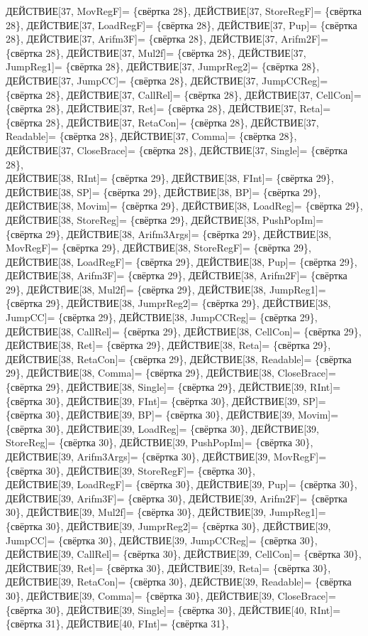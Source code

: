 \documentclass[a0]{a0poster}
\begin{document}
ДЕЙСТВИЕ[37, MovRegF]= \{свёртка 28\}, ДЕЙСТВИЕ[37, StoreRegF]= \{свёртка 28\}, ДЕЙСТВИЕ[37, LoadRegF]= \{свёртка 28\}, ДЕЙСТВИЕ[37, Pup]= \{свёртка 28\}, ДЕЙСТВИЕ[37, Arifm3F]= \{свёртка 28\}, ДЕЙСТВИЕ[37, Arifm2F]= \{свёртка 28\}, ДЕЙСТВИЕ[37, Mul2f]= \{свёртка 28\}, ДЕЙСТВИЕ[37, JumpReg1]= \{свёртка 28\}, ДЕЙСТВИЕ[37, JumprReg2]= \{свёртка 28\}, ДЕЙСТВИЕ[37, JumpCC]= \{свёртка 28\}, ДЕЙСТВИЕ[37, JumpCCReg]= \{свёртка 28\}, ДЕЙСТВИЕ[37, CallRel]= \{свёртка 28\}, ДЕЙСТВИЕ[37, CellCon]= \{свёртка 28\}, ДЕЙСТВИЕ[37, Ret]= \{свёртка 28\}, ДЕЙСТВИЕ[37, Reta]= \{свёртка 28\}, ДЕЙСТВИЕ[37, RetaCon]= \{свёртка 28\}, ДЕЙСТВИЕ[37, Readable]= \{свёртка 28\}, ДЕЙСТВИЕ[37, Comma]= \{свёртка 28\}, ДЕЙСТВИЕ[37, CloseBrace]= \{свёртка 28\}, ДЕЙСТВИЕ[37, Single]= \{свёртка 28\}, \\
ДЕЙСТВИЕ[38, RInt]= \{свёртка 29\}, ДЕЙСТВИЕ[38, FInt]= \{свёртка 29\}, ДЕЙСТВИЕ[38, SP]= \{свёртка 29\}, ДЕЙСТВИЕ[38, BP]= \{свёртка 29\}, ДЕЙСТВИЕ[38, Movim]= \{свёртка 29\}, ДЕЙСТВИЕ[38, LoadReg]= \{свёртка 29\}, ДЕЙСТВИЕ[38, StoreReg]= \{свёртка 29\}, ДЕЙСТВИЕ[38, PushPopIm]= \{свёртка 29\}, ДЕЙСТВИЕ[38, Arifm3Args]= \{свёртка 29\}, ДЕЙСТВИЕ[38, MovRegF]= \{свёртка 29\}, ДЕЙСТВИЕ[38, StoreRegF]= \{свёртка 29\}, ДЕЙСТВИЕ[38, LoadRegF]= \{свёртка 29\}, ДЕЙСТВИЕ[38, Pup]= \{свёртка 29\}, ДЕЙСТВИЕ[38, Arifm3F]= \{свёртка 29\}, ДЕЙСТВИЕ[38, Arifm2F]= \{свёртка 29\}, ДЕЙСТВИЕ[38, Mul2f]= \{свёртка 29\}, ДЕЙСТВИЕ[38, JumpReg1]= \{свёртка 29\}, ДЕЙСТВИЕ[38, JumprReg2]= \{свёртка 29\}, ДЕЙСТВИЕ[38, JumpCC]= \{свёртка 29\}, ДЕЙСТВИЕ[38, JumpCCReg]= \{свёртка 29\}, \\
ДЕЙСТВИЕ[38, CallRel]= \{свёртка 29\}, ДЕЙСТВИЕ[38, CellCon]= \{свёртка 29\}, ДЕЙСТВИЕ[38, Ret]= \{свёртка 29\}, ДЕЙСТВИЕ[38, Reta]= \{свёртка 29\}, ДЕЙСТВИЕ[38, RetaCon]= \{свёртка 29\}, ДЕЙСТВИЕ[38, Readable]= \{свёртка 29\}, ДЕЙСТВИЕ[38, Comma]= \{свёртка 29\}, ДЕЙСТВИЕ[38, CloseBrace]= \{свёртка 29\}, ДЕЙСТВИЕ[38, Single]= \{свёртка 29\}, ДЕЙСТВИЕ[39, RInt]= \{свёртка 30\}, ДЕЙСТВИЕ[39, FInt]= \{свёртка 30\}, ДЕЙСТВИЕ[39, SP]= \{свёртка 30\}, ДЕЙСТВИЕ[39, BP]= \{свёртка 30\}, ДЕЙСТВИЕ[39, Movim]= \{свёртка 30\}, ДЕЙСТВИЕ[39, LoadReg]= \{свёртка 30\}, ДЕЙСТВИЕ[39, StoreReg]= \{свёртка 30\}, ДЕЙСТВИЕ[39, PushPopIm]= \{свёртка 30\}, ДЕЙСТВИЕ[39, Arifm3Args]= \{свёртка 30\}, ДЕЙСТВИЕ[39, MovRegF]= \{свёртка 30\}, ДЕЙСТВИЕ[39, StoreRegF]= \{свёртка 30\}, \\
ДЕЙСТВИЕ[39, LoadRegF]= \{свёртка 30\}, ДЕЙСТВИЕ[39, Pup]= \{свёртка 30\}, ДЕЙСТВИЕ[39, Arifm3F]= \{свёртка 30\}, ДЕЙСТВИЕ[39, Arifm2F]= \{свёртка 30\}, ДЕЙСТВИЕ[39, Mul2f]= \{свёртка 30\}, ДЕЙСТВИЕ[39, JumpReg1]= \{свёртка 30\}, ДЕЙСТВИЕ[39, JumprReg2]= \{свёртка 30\}, ДЕЙСТВИЕ[39, JumpCC]= \{свёртка 30\}, ДЕЙСТВИЕ[39, JumpCCReg]= \{свёртка 30\}, ДЕЙСТВИЕ[39, CallRel]= \{свёртка 30\}, ДЕЙСТВИЕ[39, CellCon]= \{свёртка 30\}, ДЕЙСТВИЕ[39, Ret]= \{свёртка 30\}, ДЕЙСТВИЕ[39, Reta]= \{свёртка 30\}, ДЕЙСТВИЕ[39, RetaCon]= \{свёртка 30\}, ДЕЙСТВИЕ[39, Readable]= \{свёртка 30\}, ДЕЙСТВИЕ[39, Comma]= \{свёртка 30\}, ДЕЙСТВИЕ[39, CloseBrace]= \{свёртка 30\}, ДЕЙСТВИЕ[39, Single]= \{свёртка 30\}, ДЕЙСТВИЕ[40, RInt]= \{свёртка 31\}, ДЕЙСТВИЕ[40, FInt]= \{свёртка 31\}, \\
\end{document}
